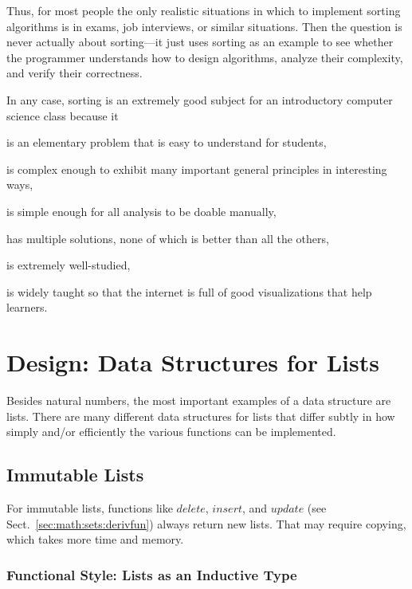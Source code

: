 Thus, for most people the only realistic situations in which to implement sorting algorithms is in exams, job interviews, or similar situations.
Then the question is never actually about sorting---it just uses sorting as an example to see whether the programmer understands how to design algorithms, analyze their complexity, and verify their correctness.

In any case, sorting is an extremely good subject for an introductory computer science class because it
\begin{compactitem}
 \item is an elementary problem that is easy to understand for students,
 \item is complex enough to exhibit many important general principles in interesting ways,
 \item is simple enough for all analysis to be doable manually,
 \item has multiple solutions, none of which is better than all the others,
 \item is extremely well-studied,
 \item is widely taught so that the internet is full of good visualizations that help learners.
\end{compactitem}


\section{Design: Data Structures for Lists}\label{sec:ad:list:ds}


Besides natural numbers, the most important examples of a data structure are lists.
There are many different data structures for lists that differ subtly in how simply and/or efficiently the various functions can be implemented.

\subsection{Immutable Lists}

For immutable lists, functions like $delete$, $insert$, and $update$ (see Sect.~\ref{sec:math:sets:derivfun}) always return new lists.
That may require copying, which takes more time and memory.

\subsubsection{Functional Style: Lists as an Inductive Type}

